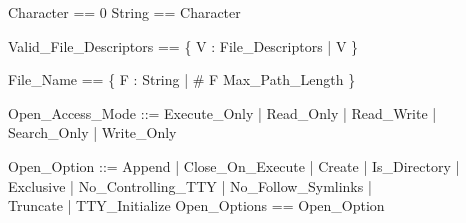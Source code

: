 \pagestyle{empty}

\begin{zed}
Character == 0 
\also
String == \seq Character
\end{zed}
\begin{zed}
Valid\_File\_Descriptors == \{ V : File\_Descriptors | V  \}
\end{zed}
\begin{zed}
File\_Name == \{ F : String | \# F \leq Max\_Path\_Length \}
\end{zed}
\begin{zed}
Open\_Access\_Mode ::= Execute\_Only | Read\_Only | Read\_Write | Search\_Only | Write\_Only
\end{zed}
\begin{zed}
Open\_Option ::= Append | Close\_On\_Execute | Create | Is\_Directory |\\
                 Exclusive | No\_Controlling\_TTY | No\_Follow\_Symlinks |\\
                 Truncate | TTY\_Initialize
\also
Open\_Options == \power Open\_Option
\end{zed}

